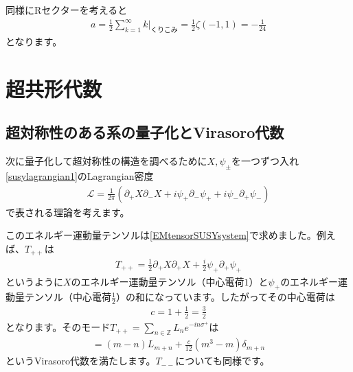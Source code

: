 \documentclass[report,paper=a4, fontsize=12pt, line_length=16cm, number_of_lines=34,dvipdfmx]{jlreq}
\numberwithin{equation}{chapter}
\numberwithin{equation}{section}
\newcommand{\Zb}{\mathbb{Z}}
\newcommand{\del}{\partial}
\newcommand{\Lcal}{\mathcal{L}}
\begin{document}
同様にRセクターを考えると
\begin{align}
  a=\frac12 \sum_{k=1}^{\infty}k\Bigg|_{\text{くりこみ}}=\frac12\zeta(-1,1)=-\frac{1}{24}
  \label{aRfermion1}
\end{align}
となります。

\section{超共形代数}
\subsection{超対称性のある系の量子化とVirasoro代数}
次に量子化して超対称性の構造を調べるために$X,\psi_{\pm}$を一つずつ入れ\eqref{susylagrangian1}のLagrangian密度
\begin{align}
  \Lcal=\frac{1}{2\pi}\left( 
    \del_{+}X\del_{-}X+i\psi_{+}\del_{-}\psi_{+}+i\psi_{-}\del_{+}\psi_{-}
   \right)
\end{align}
で表される理論を考えます。

このエネルギー運動量テンソルは\eqref{EMtensorSUSYsystem}で求めました。例えば、$T_{++}$は
\begin{align}
  T_{++}=\frac12\del_{+}X\del_{+}X+\frac{i}{2}\psi_{+}\del_{+}\psi_{+}
\end{align}
というように$X$のエネルギー運動量テンソル（中心電荷$1$）と$\psi_{+}$のエネルギー運動量テンソル（中心電荷$\frac12$）の和になっています。したがってその中心電荷は
\begin{align}
  c=1+\frac12 =\frac{3}{2}
\end{align}
となります。そのモード$T_{++}=\sum_{n\in\Zb}L_{n}e^{-in\sigma^+}$は
\begin{align}
  [L_m,L_n]=(m-n)L_{m+n}+\frac{c}{12}(m^3-m)\delta_{m+n}\label{VirasoroXpsi}
\end{align}
というVirasoro代数を満たします。$T_{--}$についても同様です。
\end{document}
